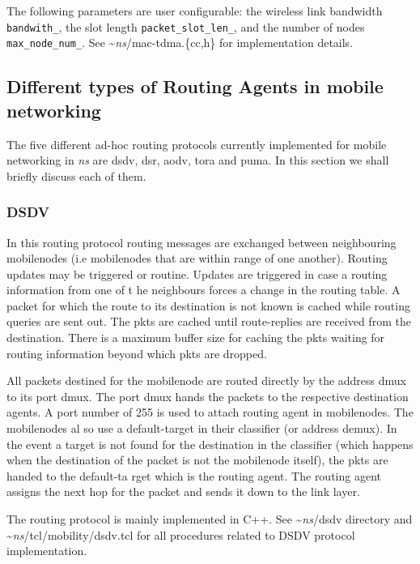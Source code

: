 The following parameters are user configurable:
 the wireless link bandwidth {\tt bandwith\_},  
  the slot length {\tt packet\_slot\_len\_}, 
  and the number of nodes {\tt max\_node\_num\_}.
See \textasciitilde\emph{ns}/{mac-tdma.\{cc,h\}} for implementation details.

\subsection{Different types of Routing Agents in mobile networking}
\label{sec:mobilenode-routing}

The five different ad-hoc routing protocols currently implemented
for mobile networking in \emph{ns} are dsdv, dsr, aodv, tora and puma. 
In this section we shall briefly discuss each of them.

\subsubsection{DSDV}
\label{sec:dsdv}

In this routing protocol routing messages are exchanged between
neighbouring mobilenodes (i.e mobilenodes that are within range of one
another). Routing updates may be triggered or routine. Updates are
triggered in case a routing information from one of t   
he neighbours forces a change in the routing table.
A packet for which the route to its destination is not known is cached
while routing queries are sent out. The pkts are cached until
route-replies are received from the destination. There is a maximum buffer
size for caching the pkts waiting for routing information beyond which
pkts are dropped. 

All packets destined for the mobilenode are routed directly by the address
dmux to its port dmux. The port dmux hands the packets to the respective
destination agents. A port number of 255 is used to attach routing agent
in mobilenodes. The mobilenodes al
so use a default-target in their classifier (or address demux). In the
event a target is not found for the destination in the classifier (which
happens when the destination of the packet is not the mobilenode itself),
the pkts are handed to the default-ta   
rget which is the routing agent. The routing agent assigns the next hop
for the packet and sends it down to the link layer. 

The routing protocol is mainly implemented in C++. See \textasciitilde\emph{ns}/{dsdv}
directory and \textasciitilde\emph{ns}/{tcl/mobility/dsdv.tc}l for all procedures related to
DSDV protocol implementation.  

